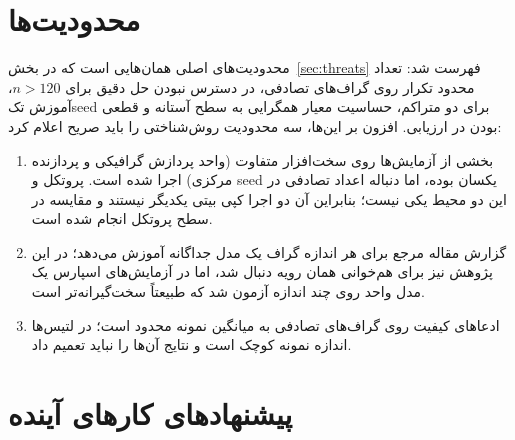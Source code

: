 \section{محدودیت‌ها}
\label{sec:limits}

محدودیت‌های اصلی همان‌هایی است که در بخش~\ref{sec:threats} فهرست شد: تعداد
محدود تکرار روی گراف‌های تصادفی، در دسترس نبودن حل دقیق برای $n>120$، آموزش
تک‌seed برای دو  متراکم، حساسیت معیار همگرایی به سطح آستانه و
قطعی بودن  در ارزیابی. افزون بر این‌ها، سه محدودیت روش‌شناختی را
باید صریح اعلام کرد:

\begin{enumerate}
  \item بخشی از آزمایش‌ها روی سخت‌افزار متفاوت (واحد پردازش گرافیکی و پردازنده
        مرکزی) اجرا شده است. پروتکل و seed یکسان بوده، اما دنباله اعداد تصادفی
        در این دو محیط یکی نیست؛ بنابراین آن دو اجرا کپی بیتی یکدیگر نیستند و
        مقایسه در سطح پروتکل انجام شده است.
  \item گزارش مقاله مرجع برای هر اندازه گراف یک مدل جداگانه آموزش می‌دهد؛
        در این پژوهش نیز برای هم‌خوانی همان رویه دنبال شد، اما در آزمایش‌های
        اسپارس یک مدل واحد روی چند اندازه آزمون شد که طبیعتاً سخت‌گیرانه‌تر است.
  \item ادعاهای کیفیت روی گراف‌های تصادفی به میانگین نمونه محدود است؛ در
        لتیس‌ها اندازه نمونه کوچک است و نتایج آن‌ها را نباید تعمیم داد.
\end{enumerate}

\section{پیشنهادهای کارهای آینده}
\label{sec:future}

